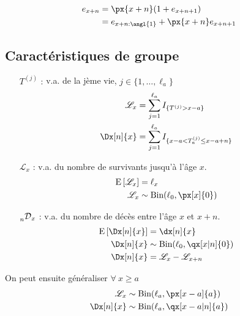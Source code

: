 \documentclass[10pt, french]{article}
\begin{document}
\begin{multicols*}{3}
\begin{align*}
	e_{x + n} &= \px{x + n} (1 + e_{x + n + 1}) \\
			  &= e_{x + n:\angl{1}} + \px{x + n} e_{x + n + 1} 
\end{align*}

\columnbreak
\subsection{Caractéristiques de groupe}
\begin{itemize}
\item[$T^{(j)}$ : ] v.a. de la jème vie, $j \in \{1, \dots, \ell_a\}$
\begin{align*}
	\mathscr{L}_x &= \sum_{j = 1}^{\ell_a} I_{\{T^{(j)} > x - a\}} \\
	\Dx[n]{x} &= \sum_{j = 1}^{\ell_a} I_{\{x - a < T^{(j)}_a \le x - a + n\}} \\
\end{align*}

\item[$\mathscr{L}_x$ : ] v.a. du nombre de survivants jusqu'à l'âge $x$.
\begin{align*}
\esp{\mathscr{L}_x} &= \ell_x\\
\mathscr{L}_x &\sim \text{Bin}(\ell_0, \px[x]{0}) \\
\end{align*}
\item[$\prescript{}{n}{\mathcal{D}}_x$ : ] v.a. du nombre de décès entre l'âge $x$ et $x+n$.
\begin{align*}
	\esp{\Dx[n]{x}} &= \dx[n]{x} \\
	\Dx[n]{x} &\sim \text{Bin}(\ell_0, \qx[x| n]{0}) \\
	\Dx[n]{x} &= \mathscr{L}_x - \mathscr{L}_{x+n} \\
\end{align*}
\end{itemize}

On peut ensuite généraliser $\forall \ x \ge a$ 
\begin{align*}
	\mathscr{L}_x &\sim \text{Bin}(\ell_a, \px[x - a]{a}) \\
	\Dx[n]{x} &\sim \text{Bin}(\ell_a, \qx[x - a | n]{a}) \\
\end{align*}


\end{multicols*}
\end{document}
